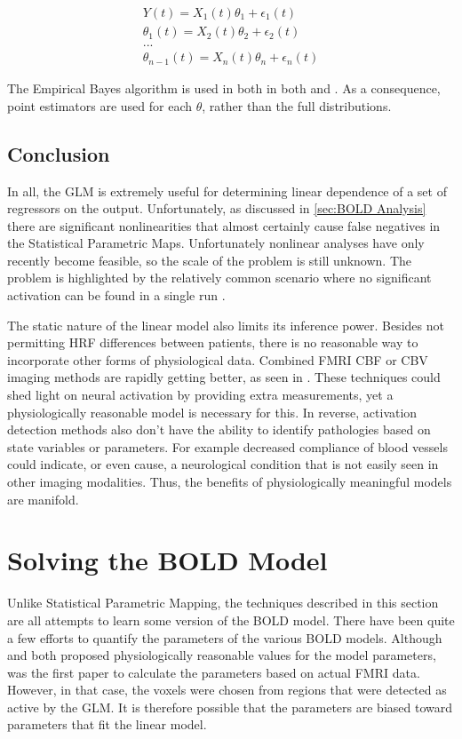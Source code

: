 \begin{eqnarray}
\label{eq:Hierarchical}
Y(t) = X_1(t)\theta_1 + \epsilon_1(t)            \nonumber \\
\theta_1(t) = X_2(t)\theta_2 + \epsilon_2(t)     \nonumber \\
...                                              \nonumber \\
\theta_{n-1}(t) = X_n(t)\theta_n + \epsilon_n(t) 
\end{eqnarray}

The Empirical Bayes algorithm is used in both in both \cite{Friston2002} 
and \cite{Hoffman1997}. As a consequence, point estimators 
are used for each $\theta$, rather than the full distributions.

\subsection{Conclusion}
\label{sec:BackgroundConclusion}
In all, the GLM is extremely useful for determining linear 
dependence of a set of regressors on the output. Unfortunately, as discussed in
\autoref{sec:BOLD Analysis} there are significant nonlinearities 
that almost certainly cause false negatives in the Statistical Parametric
Maps. Unfortunately nonlinear analyses have only recently become feasible,
so the scale of the problem is still unknown. The problem is 
highlighted by the relatively common scenario where no significant
activation can be found in a single run \cite{Riera2004}
\cite{Johnston2008}.  

The static nature of the  linear model also limits its inference power. 
Besides not permitting HRF differences between patients, there is no
reasonable way to incorporate other forms of physiological
data. Combined FMRI CBF or CBV imaging methods are rapidly getting better,
as seen in \cite{Chan2009}. These techniques could shed light on
neural activation by providing extra measurements, yet a 
physiologically reasonable model is necessary for this.
In reverse, activation detection methods also don't have the ability 
to identify pathologies based on state variables or parameters. For
example decreased compliance of
blood vessels could indicate, or even cause, a neurological condition that 
is not easily seen in other imaging modalities. Thus, the benefits
of physiologically meaningful models are manifold.

\section{Solving the BOLD Model}
Unlike Statistical Parametric Mapping, the techniques described in this
section are all attempts to learn some version of the BOLD model. 
There have been quite a few efforts to quantify the parameters of the
various BOLD models.  Although \cite{Buxton1998} and \cite{Friston2000}
both proposed physiologically reasonable values for the model parameters, 
\cite{Friston2002b} was the first paper to calculate the parameters based 
on actual FMRI data. However, in that case, the voxels were chosen from
regions that were detected as active by the GLM. It is therefore possible
that the parameters are biased toward parameters that fit the linear model.

